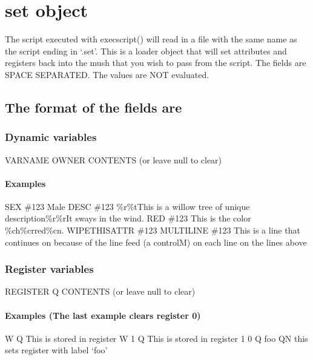 \documentclass[letterpaper,10pt,english]{sphinxmanual}
\begin{document}
\section{set object}
\label{\detokenize{20-execscript:set-object}}
\sphinxAtStartPar
The script executed with execscript() will read in a file with the same name
as the script ending in ‘.set’.  This is a loader object that will set attributes
and registers back into the mush that you wish to pass from the script. The
fields are SPACE SEPARATED.  The values are NOT evaluated.


\subsection{The format of the fields are}
\label{\detokenize{20-execscript:the-format-of-the-fields-are}}

\subsubsection{Dynamic variables}
\label{\detokenize{20-execscript:id1}}
\sphinxAtStartPar
VARNAME        OWNER        CONTENTS (or leave null to clear)


\paragraph{Examples}
\label{\detokenize{20-execscript:examples}}
\sphinxAtStartPar
SEX \#123 Male
DESC \#123 \%r\%tThis is a willow tree of unique description\%r\%rIt sways in the wind.
RED \#123 This is the color \%ch\%crred\%cn.
WIPETHISATTR \#123
MULTILINE \#123 This is a line
that continues on
because of the line feed (a control\sphinxhyphen{}M) on each line
on the lines above


\subsubsection{Register variables}
\label{\detokenize{20-execscript:id2}}
\sphinxAtStartPar
REGISTER       Q            CONTENTS (or leave null to clear)


\paragraph{Examples (The last example clears register 0)}
\label{\detokenize{20-execscript:examples-the-last-example-clears-register-0}}
\sphinxAtStartPar
W Q This is stored in register W
1 Q This is stored in register 1
0 Q
foo QN this sets register with label ‘foo’
\end{document}
